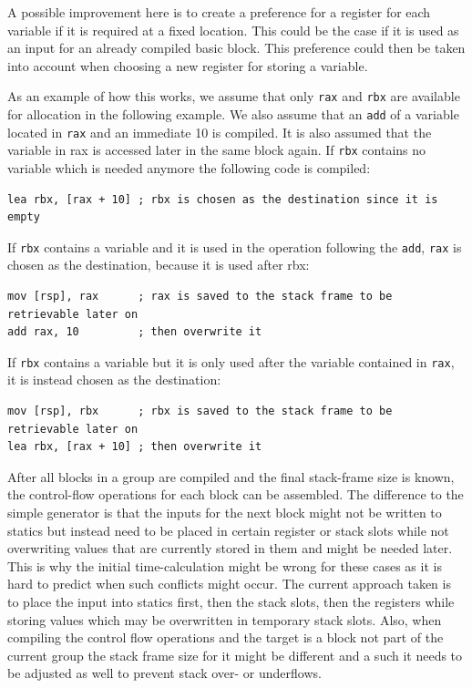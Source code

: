 \documentclass[course=eragp]{aspdoc}
\begin{document}
\par

A possible improvement here is to create a preference for a register for each variable if it is
required at a fixed location. This could be the case if it is used as an input for an already compiled basic block.
This preference could then be taken into account when choosing a new register for storing a variable.

\par

As an example of how this works, we assume that only \texttt{rax} and \texttt{rbx} are available for allocation in the
following example. We also assume that an \texttt{add} of a variable located in \texttt{rax} and an
immediate 10 is compiled.
It is also assumed that the variable in rax is accessed later in the same block again.
If \texttt{rbx} contains no variable which is needed anymore the following code is compiled:
\begin{lstlisting}[language={[x86masm]Assembler},float=h]
lea rbx, [rax + 10] ; rbx is chosen as the destination since it is empty
\end{lstlisting}
\FloatBarrier

If \texttt{rbx} contains a variable and it is used in the operation following the \texttt{add},
\texttt{rax} is chosen as the destination, because it is used after rbx:
\begin{lstlisting}[language={[x86masm]Assembler},float=h]
mov [rsp], rax      ; rax is saved to the stack frame to be retrievable later on
add rax, 10         ; then overwrite it
\end{lstlisting}
\FloatBarrier

If \texttt{rbx} contains a variable but it is only used after the variable contained in
\texttt{rax}, it is instead chosen as the destination:
\begin{lstlisting}[language={[x86masm]Assembler},float=h]
mov [rsp], rbx      ; rbx is saved to the stack frame to be retrievable later on
lea rbx, [rax + 10] ; then overwrite it
\end{lstlisting}

\FloatBarrier
\par

After all blocks in a group are compiled and the final stack-frame size is known, the control-flow operations for each block can be assembled.
The difference to the simple generator is that the inputs for the next block might not be written to statics but instead
need to be placed in certain register or stack slots while not overwriting values that are currently stored in them and
might be needed later.
This is why the initial time-calculation might be wrong for these cases as it is hard to predict when such
conflicts might occur. The current approach taken is to place the input into statics first, then the stack slots, then
the registers while storing values which may be overwritten in temporary stack slots.
Also, when compiling the control flow operations and the target is a block not part of the current group the stack frame
size for it might be different and a such it needs to be adjusted as well to prevent stack over- or underflows.
\end{document}
